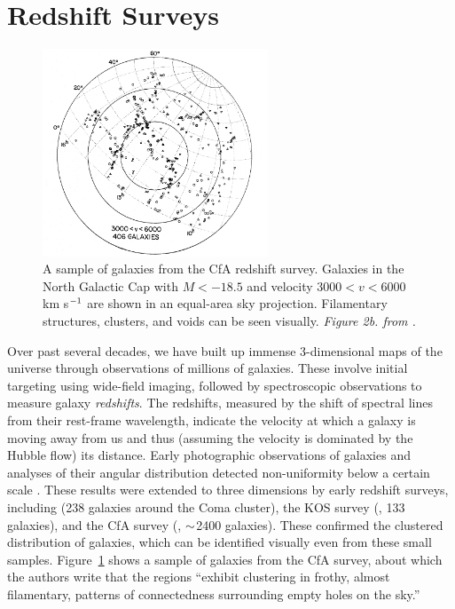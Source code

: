 \section{Redshift Surveys}

\begin{figure}[htp!]
    \centering
    \includegraphics[width=0.6\textwidth]{cfa_survey}
    \caption{A sample of galaxies from the CfA redshift survey. Galaxies in the North Galactic Cap with $M<-18.5$ and velocity $3000<v<6000$ km s$^{-1}$ are shown in an equal-area sky projection. Filamentary structures, clusters, and voids can be seen visually. \emph{Figure 2b. from \cite{davis_survey_1982}.}}
    \label{fig:cfa_survey}
    \end{figure}

Over past several decades, we have built up immense 3-dimensional maps of the universe through observations of millions of galaxies.
These involve initial targeting using wide-field imaging, followed by spectroscopic observations to measure galaxy \emph{redshifts}.
The redshifts, measured by the shift of spectral lines from their rest-frame wavelength, indicate the velocity at which a galaxy is moving away from us and thus (assuming the velocity is dominated by the Hubble flow) its distance.
Early photographic observations of galaxies and  analyses of their angular distribution detected non-uniformity below a certain scale \citep{shapley_survey_1932,hubble_distribution_1934,seldner_new_1977,peebles_galaxy_2001}.
These results were extended to three dimensions by early redshift surveys, including \cite{gregory_comaa1367_1978} (238 galaxies around the Coma cluster), the KOS survey (\citealt{kirshner_million_1981}, 133 galaxies), and the CfA survey (\citealt{davis_survey_1982}, $\mathord{\sim}$2400 galaxies).
These confirmed the clustered distribution of galaxies, which can be identified visually even from these small samples. 
Figure~\ref{fig:cfa_survey} shows a sample of galaxies from the CfA survey, about which the authors write that the regions ``exhibit clustering in frothy, almost filamentary, patterns of connectedness surrounding empty holes on the sky.''

